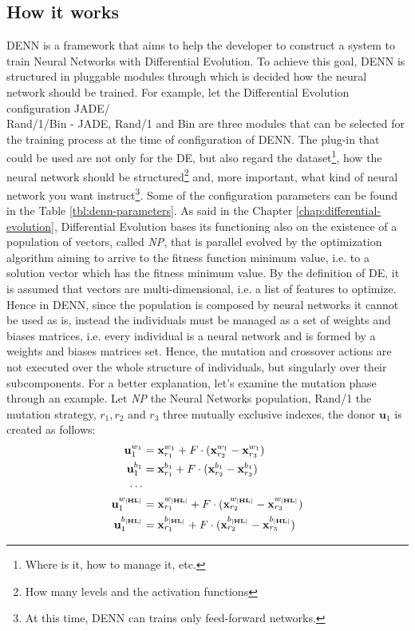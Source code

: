 \subsection{How it works}
DENN is a framework that aims to help the developer to construct a system to train Neural Networks with Differential Evolution. To achieve this goal, DENN is structured in pluggable modules through which is decided how the neural network should be trained. For example, let the Differential Evolution configuration JADE/\\Rand/1/Bin - JADE, Rand/1 and Bin are three modules that can be selected for the training process at the time of configuration of DENN. The plug-in that could be used are not only for the DE, but also regard the dataset\footnote{Where is it, how to manage it, etc.}, how the neural network should be structured\footnote{How many levels and the activation functions} and, more important, what kind of neural network you want instruct\footnote{At this time, DENN can trains only feed-forward networks.}. Some of the configuration parameters can be found in the Table \ref{tbl:denn-parameters}.\newline\newline
As said in the Chapter \ref{chap:differential-evolution}, Differential Evolution bases its functioning also on the existence of a population of vectors, called \textit{NP}, that is parallel evolved by the optimization algorithm aiming to arrive to the fitness function minimum value, i.e. to a solution vector which has the fitness minimum value. By the definition of DE, it is assumed that vectors are multi-dimensional, i.e. a list of features to optimize. Hence in DENN, since the population is composed by neural networks it cannot be used as is, instead the individuals must be managed as a set of weights and biases matrices, i.e. every individual is a neural network and is formed by a weights and biases matrices set. Hence, the mutation and crossover actions are not executed over the whole structure of individuals, but singularly over their subcomponents.\newline\newline
For a better explanation, let's examine the mutation phase through an example. Let \textit{NP} the Neural Networks population, Rand/1 the mutation strategy, $r_1, r_2$ and $r_3$ three mutually exclusive indexes, the donor $\textbf{u}_{1}$ is created as follows:
\begin{align}
	\textbf{u}_{1}^{w_1} &= \textbf{x}_{r_1}^{w_1} + F \cdot (\textbf{x}_{r_2}^{w_1} - \textbf{x}_{r_3}^{w_1}) \\
	\textbf{u}_{1}^{b_1} &= \textbf{x}_{r_1}^{b_1} + F \cdot (\textbf{x}_{r_2}^{b_1} - \textbf{x}_{r_3}^{b_1}) \\
	\cdots \cr
	\textbf{u}_{1}^{w_{|\textbf{HL}|}} &= \textbf{x}_{r_1}^{w_{|\textbf{HL}|}} + F \cdot (\textbf{x}_{r_2}^{w_{|\textbf{HL}|}} - \textbf{x}_{r_3}^{w_{|\textbf{HL}|}}) \\
	\textbf{u}_{1}^{b_{|\textbf{HL}|}} &= \textbf{x}_{r_1}^{b_{|\textbf{HL}|}} + F \cdot (\textbf{x}_{r_2}^{b_{|\textbf{HL}|}} - \textbf{x}_{r_3}^{b_{|\textbf{HL}|}})
\end{align}
